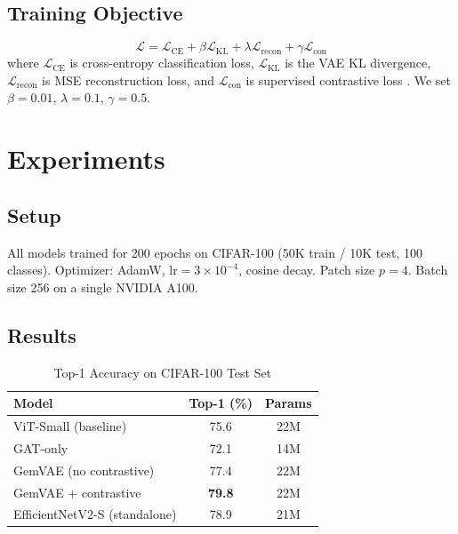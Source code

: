 \documentclass[conference]{IEEEtran}
\begin{document}
\subsection{Training Objective}
\begin{equation}
\mathcal{L} = \mathcal{L}_{\text{CE}} + \beta \mathcal{L}_{\text{KL}} + \lambda \mathcal{L}_{\text{recon}} + \gamma \mathcal{L}_{\text{con}}
\end{equation}
where $\mathcal{L}_{\text{CE}}$ is cross-entropy classification loss, $\mathcal{L}_{\text{KL}}$ is the VAE KL divergence, $\mathcal{L}_{\text{recon}}$ is MSE reconstruction loss, and $\mathcal{L}_{\text{con}}$ is supervised contrastive loss \cite{khosla2020supervised}. We set $\beta=0.01$, $\lambda=0.1$, $\gamma=0.5$.

\section{Experiments}

\subsection{Setup}
All models trained for 200 epochs on CIFAR-100 (50K train / 10K test, 100 classes). Optimizer: AdamW, $\text{lr}=3 \times 10^{-4}$, cosine decay. Patch size $p=4$. Batch size 256 on a single NVIDIA A100.

\subsection{Results}

\begin{table}[htbp]
\caption{Top-1 Accuracy on CIFAR-100 Test Set}
\begin{center}
\begin{tabular}{|l|c|c|}
\hline
\textbf{Model} & \textbf{Top-1 (\%)} & \textbf{Params} \\
\hline
ViT-Small (baseline) & 75.6 & 22M \\
GAT-only & 72.1 & 14M \\
GemVAE (no contrastive) & 77.4 & 22M \\
GemVAE + contrastive & \textbf{79.8} & 22M \\
EfficientNetV2-S (standalone) & 78.9 & 21M \\
\hline
\end{tabular}
\label{tab:results}
\end{center}
\end{table}
\end{document}
